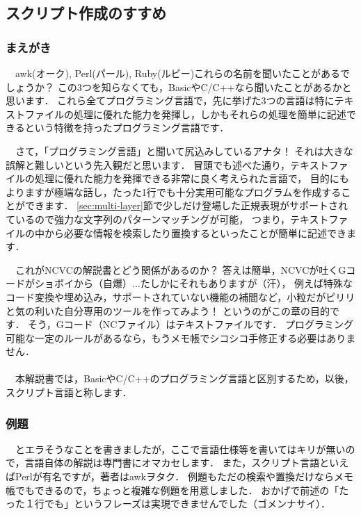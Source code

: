 

\subsection{スクリプト作成のすすめ}

\subsubsection{まえがき}
　awk(オーク), Perl(パール), Ruby(ルビー)これらの名前を聞いたことがあるでしょうか？
この3つを知らなくても，BasicやC/C++なら聞いたことがあるかと思います．
これら全てプログラミング言語で，先に挙げた3つの言語は特にテキストファイルの処理に優れた能力を発揮し，しかもそれらの処理を簡単に記述できるという特徴を持ったプログラミング言語です．

　さて，「プログラミング言語」と聞いて尻込みしているアナタ！
それは大きな誤解と難しいという先入観だと思います．
冒頭でも述べた通り，テキストファイルの処理に優れた能力を発揮できる非常に良く考えられた言語で，
目的にもよりますが極端な話し，たった1行でも十分実用可能なプログラムを作成することができます．
\ref{sec:multi-layer}節で少しだけ登場した正規表現がサポートされているので強力な文字列のパターンマッチングが可能，
つまり，テキストファイルの中から必要な情報を検索したり置換するといったことが簡単に記述できます．

　これがNCVCの解説書とどう関係があるのか？
答えは簡単，NCVCが吐くGコードがショボイから（自爆）...たしかにそれもありますが（汗），
例えば特殊なコード変換や埋め込み，サポートされていない機能の補間など，小粒だがピリリと気の利いた自分専用のツールを作ってみよう！
というのがこの章の目的です．
そう，Gコード（NCファイル）はテキストファイルです．
プログラミング可能な一定のルールがあるなら，もうメモ帳でシコシコ手修正する必要はありません．
\\ \\
　本解説書では，BasicやC/C++のプログラミング言語と区別するため，以後，スクリプト言語と称します．

\subsubsection{例題}
　とエラそうなことを書きましたが，ここで言語仕様等を書いてはキリが無いので，言語自体の解説は専門書にオマカセします．
また，スクリプト言語といえばPerlが有名ですが，著者はawkヲタク．
例題もただの検索や置換だけならメモ帳でもできるので，ちょっと複雑な例題を用意しました．
おかげで前述の「たった１行でも」というフレーズは実現できませんでした（ゴメンナサイ）．

